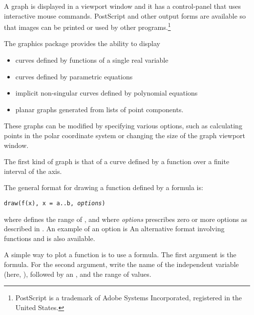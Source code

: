 A graph is displayed in a viewport window and it has a
control-panel that uses interactive mouse commands.
PostScript and other output forms are available so that \Language{}
images can be printed or used by other programs.\footnote{PostScript
is a trademark of Adobe Systems Incorporated, registered in the United
States.}

%
The \Language{} \twodim{} graphics package provides the ability to
display
%
\begin{itemize}
%
\item curves defined by functions of a single real variable
%
\item curves defined by parametric equations
%
\item implicit non-singular curves defined by polynomial equations
%
\item planar graphs generated from lists of point components.
\end{itemize}
These graphs
can be modified by specifying various options, such as
calculating points in the polar
coordinate system or changing the size of the graph viewport window.


The first kind of \twodim{} graph is that of a curve defined by a function
 over a finite interval of the  axis.

%
\beginImportant
The general format for drawing a function defined by a formula
 is:
%
\begin{center}
{\tt draw(f(x), x = a..b, {\it options})}
\end{center}
where  defines the range of , and where
{\it options} prescribes zero or more options as described in
.
An example of an option is 
An alternative format involving functions  and 
is also available.
\endImportant

A simple way to plot a function is to use a formula.
The first argument is the formula.
For the second argument, write the name of the independent variable (here, ),
followed by an \spadSyntax{=}, and the range of values.

